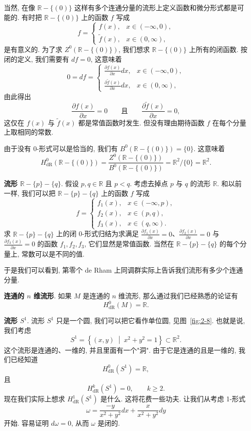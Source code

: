当然, 在像 $\mathbb{R}-\{(0)\}$ 这样有多个连通分量的流形上定义函数和微分形式都是可能的. 有时把 $\mathbb{R}-\{(0)\}$ 上的函数 $f$ 写成
\[
f=\begin{cases}f(x),&x\in(-\infty,0),\\\tilde{f}(x),&x\in(0,\infty),\end{cases}
\]
是有意义的. 为了求 $Z^0\left(\mathbb{R}-\{(0)\}\right)$, 我们想求 $\mathbb{R}-\{(0)\}$ 上所有的闭函数. 按闭的定义, 我们需要有 $df=0$, 这意味着
\[
0=df=\begin{cases}\frac{\partial f(x)}{\partial x}dx,&x\in(-\infty,0),\\[3pt]\frac{\partial\tilde{f}(x)}{\partial x}dx,&x\in(0,\infty),\end{cases}
\]
由此得出
\[
\frac{\partial f(x)}{\partial x}=0\qquad\text{且}\qquad\frac{\partial\tilde{f}(x)}{\partial x}=0,
\]
这仅在 $f(x)$ 与 $\tilde{f}(x)$ 都是常值函数时发生. 但没有理由期待函数 $f$ 在每个分量上取相同的常数.

由于没有 0-形式可以是恰当的, 我们有 $B^0\left(\mathbb{R}-\{(0)\}\right)=\{0\}$. 这意味着
\[
H_{\mathrm{dR}}^0\left(\mathbb{R}-\{(0)\}\right)=\frac{Z^0\left(\mathbb{R}-\{(0)\}\right)}{B^0\left(\mathbb{R}-\{(0)\}\right)}=\mathbb{R}^2/\{0\}=\mathbb{R}^2.
\]

\textbf{流形 $\mathbb{R}-\{p\}-\{q\}$}. 假设 $p,q\in\mathbb{R}$ 且 $p<q$. 考虑去掉点 $p$ 与 $q$ 的流形 $\mathbb{R}$. 和以前一样, 我们可以把 $\mathbb{R}-\{p\}-\{q\}$ 上的函数 $f$ 写成
\[
f=\begin{cases}f_1(x),&x\in(-\infty,p),\\f_2(x),&x\in(p,q),\\f_3(x),&x\in(q,\infty).\end{cases}
\]
求 $\mathbb{R}-\{p\}-\{q\}$ 上的闭 0-形式归结为求满足 $\frac{\partial f_1(x)}{\partial x}=0$、$\frac{\partial f_2(x)}{\partial x}=0$ 与 $\frac{\partial f_3(x)}{\partial x}=0$ 的函数 $f_1,f_2,f_3$, 它们显然是常值函数. 当然在 $\mathbb{R}-\{p\}-\{q\}$ 的每个分量上, 常数可以是不同的值.

于是我们可以看到, 第零个 de Rham 上同调群实际上告诉我们流形有多少个连通分量.

\textbf{连通的 $n$ 维流形}. 如果 $M$ 是连通的 $n$ 维流形, 那么通过我们已经熟悉的论证有
\[
H_{\mathrm{dR}}^0(M)=\mathbb{R}.
\]

\textbf{流形 $S^1$}. 流形 $S^1$ 只是一个圆, 我们可以把它看作单位圆, 见图~\ref{fig:2-8}. 也就是说, 我们考虑
\[
S^1=\left\{(x,y)\;\middle|\;x^2+y^2=1\right\}\subset\mathbb{R}^2.
\]
这个流形是连通的、一维的, 并且里面有一个"洞". 由于它是连通的且是一维的, 我们已经知道
\[
H_{\mathrm{dR}}^0(S^1)=\mathbb{R},
\]
且
\[
H_{\mathrm{dR}}^k(S^1)=0,\qquad k\geq2.
\]
现在我们实际上想求 $H_{\mathrm{dR}}^1(S^1)$ 是什么. 这将花费一些功夫. 让我们从考虑 1-形式
\[
\omega=\frac{-y}{x^2+y^2}dx+\frac{x}{x^2+y^2}dy
\]
开始. 容易证明 $d\omega=0$, 从而 $\omega$ 是闭的.

